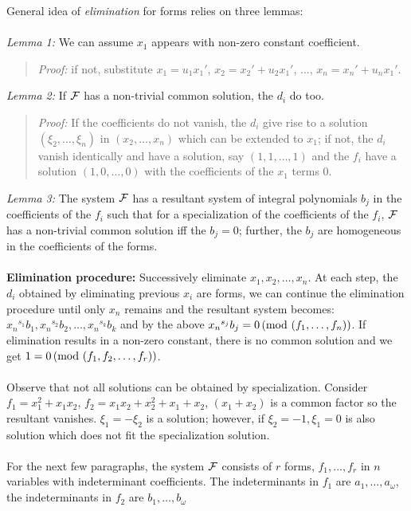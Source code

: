 General idea of \emph{elimination} for forms relies on three lemmas:
\\
\\
\emph{Lemma 1:} We can assume $x_1$ appears with non-zero
constant coefficient.
\begin{quote}
\emph{Proof:} if not, substitute $x_1= u_1 x_1'$, 
$x_2= x_2'+u_2x_1'$, ..., $x_n= x_n'+u_nx_1'$. 
\end{quote}
\emph{Lemma 2:}  If ${\cal F}$ has a non-trivial common solution, the $d_i$ do too.
\begin{quote}
\emph{Proof:} If the
coefficients do not vanish, the $d_i$ give rise to a solution $(\xi_2, \ldots, \xi_n)$
in $(x_2, \ldots, x_n)$ which can be extended to $x_1$; if not, the $d_i$ vanish identically
and have a solution, say $(1,1,\ldots,1)$ and the $f_i$ have a solution $(1,0,\ldots,0)$
with the coefficients of the $x_1$ terms $0$.  
\end{quote}
\emph{Lemma 3:} The system ${\cal F}$ has a
resultant system of integral polynomials $b_j$ in the coefficients of the $f_i$ such that
for a specialization of the coefficients of the $f_i$, ${\cal F}$ has a 
non-trivial common solution iff the $b_j=0$; further, the $b_j$ are homogeneous in the
coefficients of the forms.
\\
\\
{\bf Elimination procedure:}  Successively eliminate $x_1 , x_2, \ldots, x_n$.  At each step,
the $d_i$ obtained by eliminating previous $x_i$ are forms, 
we can continue the elimination
procedure until only $x_n$ remains and the resultant system becomes:
${x_n}^{s_1} b_1,
{x_n}^{s_2} b_2, \ldots,
{x_n}^{s_k} b_k$ and by the above
${x_n}^{s_j} b_j= 0 \thinspace \textnormal{(mod } (f_1, \ldots, f_n) \textnormal{)}$.
If elimination results in a non-zero constant, there is no
common solution and we get $1= 0 \thinspace \textnormal{(mod } (f_1, f_2, \ldots, f_r) \textnormal{)}$.
\\
\\
Observe that not all solutions can be obtained by specialization.  Consider
$f_1= x_1^2 + x_1 x_2$, $f_2= x_1 x_2 + x_2^2 + x_1 +x_2$, $(x_1+x_2)$ is a common factor
so the resultant vanishes.  $\xi_1= -\xi_2$ is a solution; however, if $\xi_2= -1,
\xi_1=0$ is also solution which does not fit the specialization solution.
\\
\\
For the next few paragraphs, the system $\cal F$ consists of
$r$ forms, $f_1, ..., f_r$ in $n$ variables
with indeterminant coefficients.
The indeterminants in $f_1$ are $a_1, \ldots , a_{\omega}$,
the indeterminants in $f_2$ are $b_1, \ldots , b_{\omega}$
